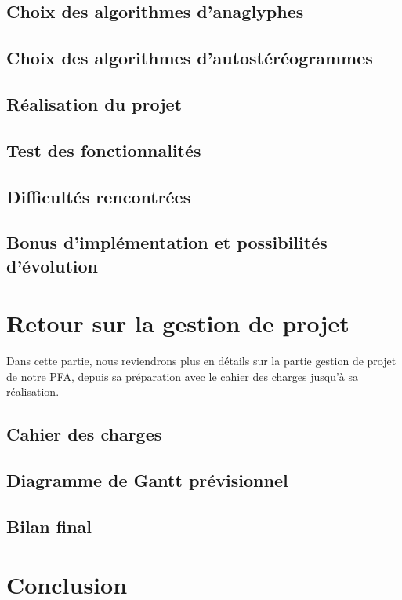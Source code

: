 \documentclass[paper=a4, fontsize=12pt]{article}
\newenvironment{changemargin}[2]{\begin{list}{}{%
      \setlength{\topsep}{0pt}%
      \setlength{\leftmargin}{0pt}%
      \setlength{\rightmargin}{0pt}%
      \setlength{\listparindent}{\parindent}%
      \setlength{\itemindent}{\parindent}%
      \setlength{\parsep}{0pt plus 1pt}%
      \addtolength{\leftmargin}{#1}%
      \addtolength{\rightmargin}{#2}%
    }\item }{\end{list}}
\numberwithin{equation}{section}		%
\numberwithin{figure}{section}			%
\numberwithin{table}{section}				%
\begin{document}
\begin{changemargin}{-1cm}{-1cm}
  \subsection{Choix des algorithmes d'anaglyphes}
  
  \subsection{Choix des algorithmes d'autostéréogrammes}
  
  \subsection{Réalisation du projet}
  
  \subsection{Test des fonctionnalités}
  
  \subsection{Difficultés rencontrées}
  
  \subsection{Bonus d'implémentation et possibilités d'évolution}
  
  
  \newpage

  \section{Retour sur la gestion de projet}
  Dans cette partie, nous reviendrons plus en détails sur la partie gestion de projet de notre PFA, depuis sa préparation avec le cahier des charges jusqu'à sa réalisation.
  \subsection{Cahier des charges}
  
  \subsection{Diagramme de Gantt prévisionnel}
  
  \subsection{Bilan final}
  
  \newpage

  \section{Conclusion}
  
  \newpage


\end{changemargin}
\end{document}
